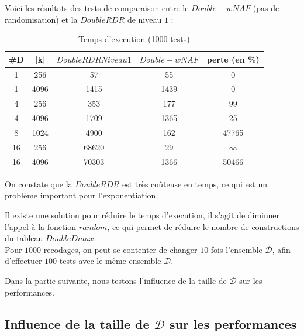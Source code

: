 \documentclass[12pt, a4paper]{memoir}
\begin{document}
Voici les résultats des tests de comparaison entre le $Double-wNAF$ (pas de randomisation) et la $DoubleRDR$ de
niveau $1$ :
\begin{table}[htbp]
\caption{Temps d'execution (1000 tests) }
\begin{center}
\begin{tabular}{ccccc}
\toprule
\#D & |k| & $DoubleRDR Niveau 1$ & $Double-wNAF$ & perte (en \%) \\
\midrule
1 & 256 & 57  & 55 & 0 \\
1 & 4096 & 1415 & 1439 & 0 \\
4 & 256 & 353 & 177 & 99 \\
4 & 4096 & 1709 & 1365 & 25 \\
8 & 1024 & 4900 & 162 & 47765 \\
16 & 256 & 68620 & 29 & $\infty$ \\
16 & 4096 & 70303 & 1366 & 50466 \\
\bottomrule
\end{tabular}
\end{center}
\label{tab:example}
\end{table}%

On constate que la $DoubleRDR$ est très coûteuse en temps, ce qui est un problème important pour l'exponentiation.

Il existe une solution pour réduire le temps d'execution, il s'agit de diminuer l'appel à la fonction $random$,
ce qui permet de réduire le nombre de constructions du tableau $DoubleDmax$. \\
Pour $1000$ recodages, on peut se contenter de changer $10$ fois l'ensemble $\mathcal{D}$, afin d'effectuer $100$
tests avec le même ensemble $\mathcal{D}$.

Dans la partie suivante, nous testons l'influence de la taille de $\mathcal{D}$ sur les performances.

\subsection{Influence de la taille de $\mathcal{D}$ sur les performances}
\end{document}

